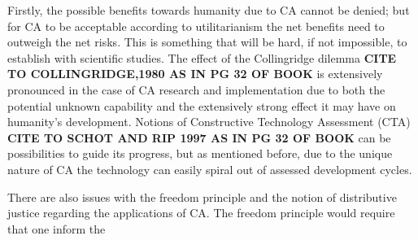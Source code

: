Firstly, the possible benefits towards humanity due to CA cannot be denied; but for CA to be acceptable according to utilitarianism the net benefits need to outweigh the net risks. This is something that will be hard, if not impossible, to establish with scientific studies. The effect of the Collingridge dilemma {\bf CITE TO COLLINGRIDGE,1980 AS IN PG 32 OF BOOK} is extensively pronounced in the case of CA research and implementation due to both the potential unknown capability and the extensively strong effect it may have on humanity's development. Notions of Constructive Technology Assessment (CTA) {\bf CITE TO SCHOT AND RIP 1997 AS IN PG 32 OF BOOK} can be possibilities to guide its progress, but as mentioned before, due to the unique nature of CA the technology can easily spiral out of assessed development cycles. 

There are also issues with the freedom principle and the notion of distributive justice regarding the applications of CA. The freedom principle would require that one inform the 




